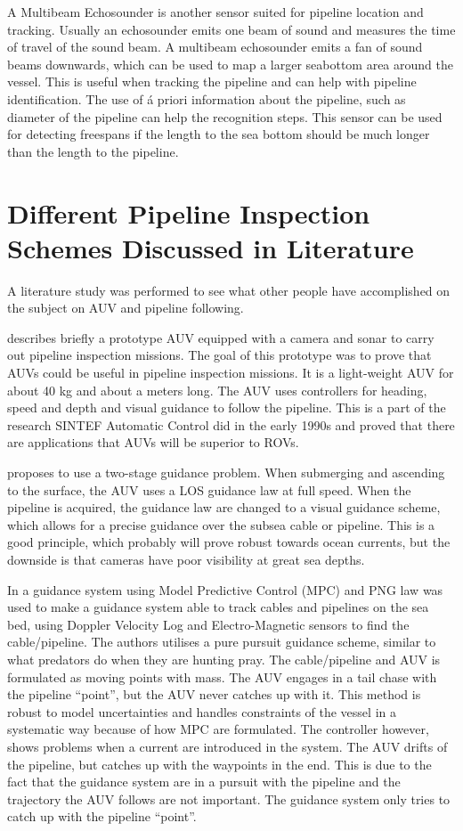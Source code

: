 	A Multibeam Echosounder is another sensor suited for pipeline location and tracking. 
	Usually an echosounder emits one beam of sound and measures the time of travel of the sound
	beam. A multibeam echosounder emits a fan of sound beams downwards, which can be used to map a larger
	seabottom area around the vessel. This is useful when tracking the pipeline and can help
	with pipeline identification. The use of \'a priori information about the pipeline, such as diameter
	of the pipeline can help the
	recognition steps. This sensor can be used for detecting freespans if the length to the sea bottom
	should be much longer than the length to the pipeline. 


	
\section{Different Pipeline Inspection Schemes Discussed in Literature}
	A literature study was performed to see what other people have accomplished on the subject on AUV and 
	pipeline following. 
	
	\cite{piscis} describes briefly a prototype AUV equipped with a camera and sonar to carry out pipeline
	inspection missions. The goal of this prototype was to prove that AUVs could be useful in pipeline
	inspection missions. It is a light-weight AUV for about 40 kg and about a meters long.
	The AUV uses controllers for heading, speed and depth and visual guidance to follow the pipeline. 
	This is a part
	of the research SINTEF Automatic Control did in the early 1990s and proved that there are applications
	that AUVs will be superior to ROVs. 

	\cite{GuidanceReview} proposes to use a two-stage guidance problem. When submerging and ascending to the surface, 
	the AUV uses a LOS guidance law at full speed. When the pipeline is acquired, the guidance law are
	changed to a visual guidance scheme, which allows for a precise guidance over the subsea cable or
	pipeline. This is a good principle, which probably will prove robust towards ocean currents, but the
	downside is that cameras have poor visibility at great sea depths.
		
	In \cite{MPC_pure_pursuit} a guidance system using Model Predictive Control (MPC) and PNG law was used to make 
	a guidance system able to track cables and pipelines on the sea bed, using Doppler Velocity Log
	and Electro-Magnetic sensors to find the cable/pipeline. The authors utilises a pure pursuit
	guidance scheme, similar to what predators do when they are hunting pray. The cable/pipeline
	and AUV is formulated as moving points with mass. The AUV engages in a tail chase with the pipeline
	``point'', but the AUV never catches up with it. This method is robust to model uncertainties and
	handles constraints of the vessel in a systematic way because of how MPC are formulated. The
	controller however, shows problems when a current are introduced in the system. The AUV drifts of the 
	pipeline, but catches up with the waypoints in the end. This is due to the fact that the guidance
	system are in a pursuit with the pipeline and the trajectory the AUV follows are not important. The
	guidance system only tries to catch up with the pipeline ``point''.
	
